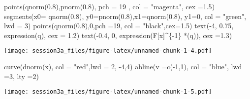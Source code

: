 \documentclass[
]{article}
\newenvironment{Shaded}{\begin{snugshade}}{\end{snugshade}}
\newcommand{\AttributeTok}[1]{\textcolor[rgb]{0.77,0.63,0.00}{#1}}
\newcommand{\DecValTok}[1]{\textcolor[rgb]{0.00,0.00,0.81}{#1}}
\newcommand{\FloatTok}[1]{\textcolor[rgb]{0.00,0.00,0.81}{#1}}
\newcommand{\FunctionTok}[1]{\textcolor[rgb]{0.00,0.00,0.00}{#1}}
\newcommand{\NormalTok}[1]{#1}
\newcommand{\SpecialCharTok}[1]{\textcolor[rgb]{0.00,0.00,0.00}{#1}}
\newcommand{\StringTok}[1]{\textcolor[rgb]{0.31,0.60,0.02}{#1}}
\begin{document}
\begin{Shaded}
\begin{Highlighting}[]
\FunctionTok{points}\NormalTok{(}\FunctionTok{qnorm}\NormalTok{(}\FloatTok{0.8}\NormalTok{),}\FunctionTok{pnorm}\NormalTok{(}\FloatTok{0.8}\NormalTok{), }\AttributeTok{pch =} \DecValTok{19}
\NormalTok{      , }\AttributeTok{col =} \StringTok{"magenta"}\NormalTok{, }\AttributeTok{cex =}\FloatTok{1.5}\NormalTok{)}
\FunctionTok{segments}\NormalTok{(}\AttributeTok{x0=} \FunctionTok{qnorm}\NormalTok{(}\FloatTok{0.8}\NormalTok{), }\AttributeTok{y0=}\FunctionTok{pnorm}\NormalTok{(}\FloatTok{0.8}\NormalTok{),}\AttributeTok{x1=}\FunctionTok{qnorm}\NormalTok{(}\FloatTok{0.8}\NormalTok{), }\AttributeTok{y1=}\DecValTok{0}\NormalTok{, }\AttributeTok{col =} \StringTok{"green"}\NormalTok{, }\AttributeTok{lwd =} \DecValTok{3}\NormalTok{)}
\FunctionTok{points}\NormalTok{(}\FunctionTok{qnorm}\NormalTok{(}\FloatTok{0.8}\NormalTok{),}\DecValTok{0}\NormalTok{,}\AttributeTok{pch =}\DecValTok{19}\NormalTok{, }\AttributeTok{col =} \StringTok{"black"}\NormalTok{,}\AttributeTok{cex=}\FloatTok{1.5}\NormalTok{)}
\FunctionTok{text}\NormalTok{(}\SpecialCharTok{{-}}\DecValTok{4}\NormalTok{, }\FloatTok{0.75}\NormalTok{, }\FunctionTok{expression}\NormalTok{(q), }\AttributeTok{cex =} \FloatTok{1.2}\NormalTok{)}
\FunctionTok{text}\NormalTok{(}\SpecialCharTok{{-}}\FloatTok{0.4}\NormalTok{, }\DecValTok{0}\NormalTok{, }\FunctionTok{expression}\NormalTok{(F[x]}\SpecialCharTok{\^{}}\NormalTok{\{}\SpecialCharTok{{-}}\DecValTok{1}\NormalTok{\} }\SpecialCharTok{*}\NormalTok{(q)),}
     \AttributeTok{cex =}\FloatTok{1.3}\NormalTok{)}
\end{Highlighting}
\end{Shaded}

\texttt{[image: session3a\_files/figure-latex/unnamed-chunk-1-4.pdf]}

\begin{Shaded}
\begin{Highlighting}[]
\FunctionTok{curve}\NormalTok{(}\FunctionTok{dnorm}\NormalTok{(x), }\AttributeTok{col =} \StringTok{"red"}\NormalTok{,}\AttributeTok{lwd =} \DecValTok{2}\NormalTok{, }\SpecialCharTok{{-}}\DecValTok{4}\NormalTok{,}\DecValTok{4}\NormalTok{)}
\FunctionTok{abline}\NormalTok{(}\AttributeTok{v =}\FunctionTok{c}\NormalTok{(}\SpecialCharTok{{-}}\DecValTok{1}\NormalTok{,}\DecValTok{1}\NormalTok{), }\AttributeTok{col =} \StringTok{"blue"}\NormalTok{, }\AttributeTok{lwd =}\DecValTok{3}\NormalTok{, }\AttributeTok{lty =}\DecValTok{2}\NormalTok{)}
\end{Highlighting}
\end{Shaded}

\texttt{[image: session3a\_files/figure-latex/unnamed-chunk-1-5.pdf]}
\end{document}
